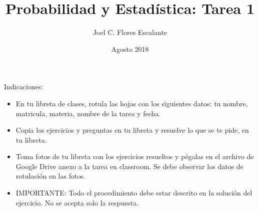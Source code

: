 \documentclass[12pt,letterpaper]{report}
\begin{document}
	\title{Probabilidad y Estadística: Tarea 1}
	\author{Joel C. Flores Escalante}
	\date{Agosto 2018}
	\maketitle
	
	Indicaciones: 
	
	\begin{itemize}
		\item En tu libreta de clases, rotula las hojas con los siguientes datos: tu nombre, matricula, materia, nombre de la tarea y fecha.
		\item Copia los ejercicios y preguntas en tu libreta y resuelve lo que se te pide, en tu libreta.   
		\item Toma  fotos de tu libreta con los ejercicios resueltos y pégalas en el archivo de Google Drive anexo a la tarea en classroom. Se debe observar los datos de rotulación en las fotos.
		\item IMPORTANTE: Todo el procedimiento debe estar descrito en la solución del ejercicio. No se acepta solo la respuesta.
	\end{itemize}
	
\end{document}
